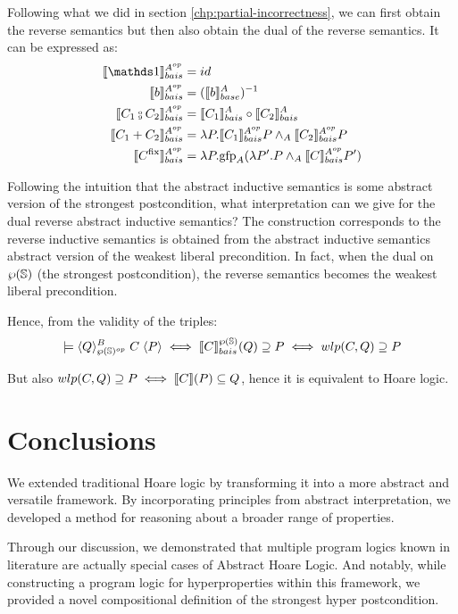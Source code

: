 \documentclass[
  10pt,       %
  twoside,    %
  a4paper,    %
  english,    %
  tikz,       %
  openright,  %
]{book}
\begin{document}
Following what we did in section \ref{chp:partial-incorrectness}, we can first
obtain the reverse semantics but then also obtain the dual of the reverse
semantics. It can be expressed as: 
\begin{align*}
  \asemback[A^{op}]{\sskip}        &= id \\
  \asemback[A^{op}]{b}             &= (\bsem{b}^A)^{-1} \\
  \asemback[A^{op}]{C_1 \fcmp C_2} &= \asemback{C_1} \circ \asemback{C_2} \\
  \asemback[A^{op}]{C_1 + C_2}     &= \lambda P . \asemback[A^{op}]{C_1} P \meet_A \asemback[A^{op}]{C_2} P \\
  \asemback[A^{op}]{C^\fix}        &= \lambda P . \gfp_A(\lambda P'. P \meet_A \asemback[A^{op}]{C} P')
\end{align*}

Following the intuition that the abstract inductive semantics is some abstract
version of the strongest postcondition, what interpretation can we give for the
dual reverse abstract inductive semantics? The construction corresponds to the
reverse inductive semantics is obtained from the abstract inductive semantics
abstract version of the weakest liberal precondition. In fact, when the dual
on $\pow{\states}$ (the strongest postcondition), the reverse semantics becomes
the weakest liberal precondition.

Hence, from the validity of the triples:
$$\models \atripleback[\pow{\states}^{op}]{Q}{C}{P} \iff
\asemback[\pow{\states}]{C}(Q) \supseteq P \iff wlp(C, Q) \supseteq P$$

But also $wlp(C, Q) \supseteq P \iff \sem{C}(P) \subseteq Q$, hence it is
equivalent to Hoare logic.

\chapter{Conclusions}

We extended traditional Hoare logic by transforming it into a more abstract and
versatile framework. By incorporating principles from abstract interpretation,
we developed a method for reasoning about a broader range of properties.

Through our discussion, we demonstrated that multiple program logics known in
literature are actually special cases of Abstract Hoare Logic. And notably, 
while constructing a program logic for hyperproperties within this framework,
we provided a novel compositional definition of the strongest hyper
postcondition.
\end{document}
